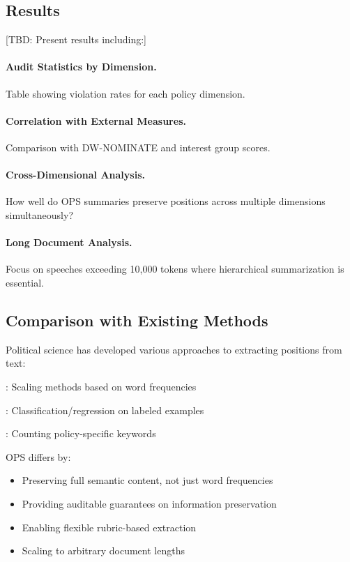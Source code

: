 \subsection{Results}

[TBD: Present results including:]

\paragraph{Audit Statistics by Dimension.}
Table showing violation rates for each policy dimension.

\paragraph{Correlation with External Measures.}
Comparison with DW-NOMINATE and interest group scores.

\paragraph{Cross-Dimensional Analysis.}
How well do OPS summaries preserve positions across multiple dimensions simultaneously?

\paragraph{Long Document Analysis.}
Focus on speeches exceeding 10,000 tokens where hierarchical summarization is essential.

\subsection{Comparison with Existing Methods}

Political science has developed various approaches to extracting positions from text:

\begin{description}[nosep]
    \item[Wordshoal/Wordfish]: Scaling methods based on word frequencies \citep{slapin2008scaling}
    \item[Supervised learning]: Classification/regression on labeled examples
    \item[Dictionary methods]: Counting policy-specific keywords
\end{description}

OPS differs by:
\begin{itemize}[nosep]
    \item Preserving full semantic content, not just word frequencies
    \item Providing auditable guarantees on information preservation
    \item Enabling flexible rubric-based extraction
    \item Scaling to arbitrary document lengths
\end{itemize}

